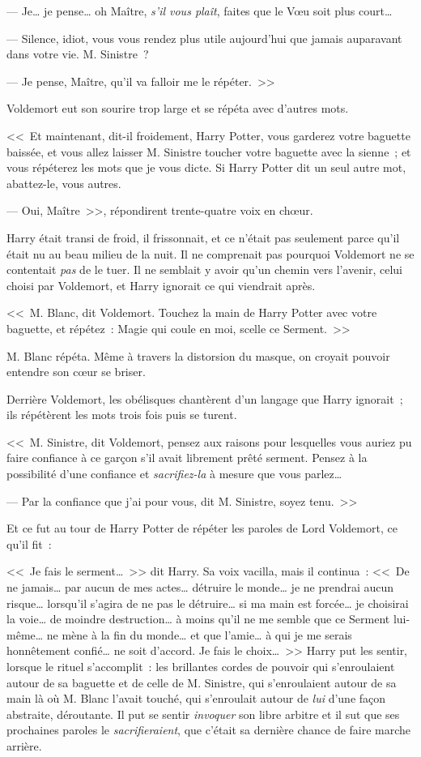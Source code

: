 --- Je… je pense… oh Maître, \emph{s'il vous plaît}, faites que le Vœu soit plus court…

--- Silence, idiot, vous vous rendez plus utile aujourd'hui que jamais auparavant dans votre vie. M. Sinistre~?

--- Je pense, Maître, qu'il va falloir me le répéter.~>>

Voldemort eut son sourire trop large et se répéta avec d'autres mots.

<<~Et maintenant, dit-il froidement, Harry Potter, vous garderez votre baguette baissée, et vous allez laisser M. Sinistre toucher votre baguette avec la sienne~; et vous répéterez les mots que je vous dicte. Si Harry Potter dit un seul autre mot, abattez-le, vous autres.

--- Oui, Maître~>>, répondirent trente-quatre voix en chœur.

Harry était transi de froid, il frissonnait, et ce n'était pas seulement parce qu'il était nu au beau milieu de la nuit. Il ne comprenait pas pourquoi Voldemort ne se contentait \emph{pas} de le tuer. Il ne semblait y avoir qu'un chemin vers l'avenir, celui choisi par Voldemort, et Harry ignorait ce qui viendrait après.

<<~M. Blanc, dit Voldemort. Touchez la main de Harry Potter avec votre baguette, et répétez~: Magie qui coule en moi, scelle ce Serment.~>>

M. Blanc répéta. Même à travers la distorsion du masque, on croyait pouvoir entendre son cœur se briser.

Derrière Voldemort, les obélisques chantèrent d'un langage que Harry ignorait~; ils répétèrent les mots trois fois puis se turent.

<<~M. Sinistre, dit Voldemort, pensez aux raisons pour lesquelles vous auriez pu faire confiance à ce garçon s'il avait librement prêté serment. Pensez à la possibilité d'une confiance et \emph{sacrifiez-la} à mesure que vous parlez…

--- Par la confiance que j'ai pour vous, dit M. Sinistre, soyez tenu.~>>

Et ce fut au tour de Harry Potter de répéter les paroles de Lord Voldemort, ce qu'il fit~:

<<~Je fais le serment…~>> dit Harry. Sa voix vacilla, mais il continua~: <<~De ne jamais… par aucun de mes actes… détruire le monde… je ne prendrai aucun risque… lorsqu'il s'agira de ne pas le détruire… si ma main est forcée… je choisirai la voie… de moindre destruction… à moins qu'il ne me semble que ce Serment lui-même… ne mène à la fin du monde… et que l'amie… à qui je me serais honnêtement confié… ne soit d'accord. Je fais le choix…~>> Harry put les sentir, lorsque le rituel s'accomplit~: les brillantes cordes de pouvoir qui s'enroulaient autour de sa baguette et de celle de M. Sinistre, qui s'enroulaient autour de sa main là où M. Blanc l'avait touché, qui s'enroulait autour de \emph{lui} d'une façon abstraite, déroutante. Il put se sentir \emph{invoquer} son libre arbitre et il sut que ses prochaines paroles le \emph{sacrifieraient}, que c'était sa dernière chance de faire marche arrière.

